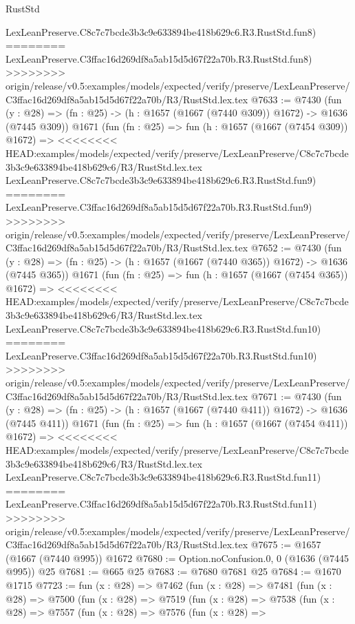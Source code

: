 \begin{lexlean}{RustStd}
\begin{coremodule}
{\begin{coremodule}
{{{{{{{{{{{{{{{{    LexLeanPreserve.C8c7c7bcde3b3c9e633894be418b629c6.R3.RustStd.fun8)
========
    LexLeanPreserve.C3ffac16d269df8a5ab15d5d67f22a70b.R3.RustStd.fun8)
>>>>>>>> origin/release/v0.5:examples/models/expected/verify/preserve/LexLeanPreserve/C3ffac16d269df8a5ab15d5d67f22a70b/R3/RustStd.lex.tex
@7633 := @7430
    (fun (y : @28) => (fn : @25) -> (h : @1657 (@1667 (@7440 @309)) @1672) -> @1636 (@7445 @309))
    @1671
    (fun (fn : @25) =>
    fun (h : @1657 (@1667 (@7454 @309)) @1672) =>
<<<<<<<< HEAD:examples/models/expected/verify/preserve/LexLeanPreserve/C8c7c7bcde3b3c9e633894be418b629c6/R3/RustStd.lex.tex
    LexLeanPreserve.C8c7c7bcde3b3c9e633894be418b629c6.R3.RustStd.fun9)
========
    LexLeanPreserve.C3ffac16d269df8a5ab15d5d67f22a70b.R3.RustStd.fun9)
>>>>>>>> origin/release/v0.5:examples/models/expected/verify/preserve/LexLeanPreserve/C3ffac16d269df8a5ab15d5d67f22a70b/R3/RustStd.lex.tex
@7652 := @7430
    (fun (y : @28) => (fn : @25) -> (h : @1657 (@1667 (@7440 @365)) @1672) -> @1636 (@7445 @365))
    @1671
    (fun (fn : @25) =>
    fun (h : @1657 (@1667 (@7454 @365)) @1672) =>
<<<<<<<< HEAD:examples/models/expected/verify/preserve/LexLeanPreserve/C8c7c7bcde3b3c9e633894be418b629c6/R3/RustStd.lex.tex
    LexLeanPreserve.C8c7c7bcde3b3c9e633894be418b629c6.R3.RustStd.fun10)
========
    LexLeanPreserve.C3ffac16d269df8a5ab15d5d67f22a70b.R3.RustStd.fun10)
>>>>>>>> origin/release/v0.5:examples/models/expected/verify/preserve/LexLeanPreserve/C3ffac16d269df8a5ab15d5d67f22a70b/R3/RustStd.lex.tex
@7671 := @7430
    (fun (y : @28) => (fn : @25) -> (h : @1657 (@1667 (@7440 @411)) @1672) -> @1636 (@7445 @411))
    @1671
    (fun (fn : @25) =>
    fun (h : @1657 (@1667 (@7454 @411)) @1672) =>
<<<<<<<< HEAD:examples/models/expected/verify/preserve/LexLeanPreserve/C8c7c7bcde3b3c9e633894be418b629c6/R3/RustStd.lex.tex
    LexLeanPreserve.C8c7c7bcde3b3c9e633894be418b629c6.R3.RustStd.fun11)
========
    LexLeanPreserve.C3ffac16d269df8a5ab15d5d67f22a70b.R3.RustStd.fun11)
>>>>>>>> origin/release/v0.5:examples/models/expected/verify/preserve/LexLeanPreserve/C3ffac16d269df8a5ab15d5d67f22a70b/R3/RustStd.lex.tex
@7675 := @1657 (@1667 (@7440 @995)) @1672
@7680 := Option.noConfusion.{0, 0} (@1636 (@7445 @995)) @25
@7681 := @665 @25
@7683 := @7680 @7681 @25
@7684 := @1670 @1715
@7723 := fun (x : @28) =>
  @7462
    (fun (x : @28) =>
    @7481
      (fun (x : @28) =>
      @7500
        (fun (x : @28) =>
        @7519
          (fun (x : @28) =>
          @7538
            (fun (x : @28) =>
            @7557
              (fun (x : @28) =>
              @7576
                (fun (x : @28) =>
}}}}}}}}}}}}}}}}
\end{coremodule}}
\end{coremodule}
\end{lexlean}
